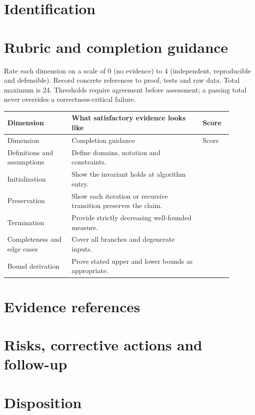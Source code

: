 \documentclass[11pt,letterpaper]{article}
\begin{document}
\tableofcontents
\clearpage
{}
\section{Identification}
\section{Rubric and completion guidance}
Rate each dimension on a scale of 0 (no evidence) to 4 (independent, reproducible and defensible). Record concrete references to proof, tests and raw data. Total maximum is 24. Thresholds require agreement before assessment; a passing total never overrides a correctness-critical failure.
\small
\begin{longtable}{@{}p{0.26\linewidth}p{0.53\linewidth}p{0.12\linewidth}@{}}\toprule Dimension & What satisfactory evidence looks like & Score\\\midrule\endfirsthead\toprule Dimension & Completion guidance & Score\\\midrule\endhead
Definitions and assumptions & Define domains, notation and constraints. & \\[1.0em]
Initialization & Show the invariant holds at algorithm entry. & \\[1.0em]
Preservation & Show each iteration or recursive transition preserves the claim. & \\[1.0em]
Termination & Provide strictly decreasing well-founded measure. & \\[1.0em]
Completeness and edge cases & Cover all branches and degenerate inputs. & \\[1.0em]
Bound derivation & Prove stated upper and lower bounds as appropriate. & \\[1.0em]
\bottomrule\end{longtable}
\normalsize\section{Evidence references}
\section{Risks, corrective actions and follow-up}
\section{Disposition}
\end{document}
